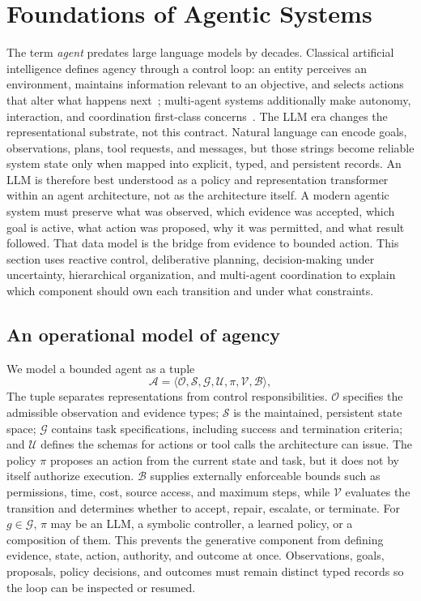 \section{Foundations of Agentic Systems}
\label{sec:background}

The term \emph{agent} predates large language models by decades. Classical artificial intelligence defines agency through a control loop: an entity perceives an environment, maintains information relevant to an objective, and selects actions that alter what happens next~\cite{russell2021aima}; multi-agent systems additionally make autonomy, interaction, and coordination first-class concerns~\cite{wooldridge2009multiagent}. The LLM era changes the representational substrate, not this contract. Natural language can encode goals, observations, plans, tool requests, and messages, but those strings become reliable system state only when mapped into explicit, typed, and persistent records. An LLM is therefore best understood as a policy and representation transformer within an agent architecture, not as the architecture itself. A modern agentic system must preserve what was observed, which evidence was accepted, which goal is active, what action was proposed, why it was permitted, and what result followed. That data model is the bridge from evidence to bounded action. This section uses reactive control, deliberative planning, decision-making under uncertainty, hierarchical organization, and multi-agent coordination to explain which component should own each transition and under what constraints.

\subsection{An operational model of agency}

We model a bounded agent as a tuple
\begin{equation}
\mathcal{A}=\langle \mathcal{O},\mathcal{S},\mathcal{G},\mathcal{U},\pi,\mathcal{V},\mathcal{B}\rangle,
\end{equation}
The tuple separates representations from control responsibilities. $\mathcal{O}$ specifies the admissible observation and evidence types; $\mathcal{S}$ is the maintained, persistent state space; $\mathcal{G}$ contains task specifications, including success and termination criteria; and $\mathcal{U}$ defines the schemas for actions or tool calls the architecture can issue. The policy $\pi$ proposes an action from the current state and task, but it does not by itself authorize execution. $\mathcal{B}$ supplies externally enforceable bounds such as permissions, time, cost, source access, and maximum steps, while $\mathcal{V}$ evaluates the transition and determines whether to accept, repair, escalate, or terminate. For $g\in\mathcal{G}$, $\pi$ may be an LLM, a symbolic controller, a learned policy, or a composition of them. This prevents the generative component from defining evidence, state, action, authority, and outcome at once. Observations, goals, proposals, policy decisions, and outcomes must remain distinct typed records so the loop can be inspected or resumed.

